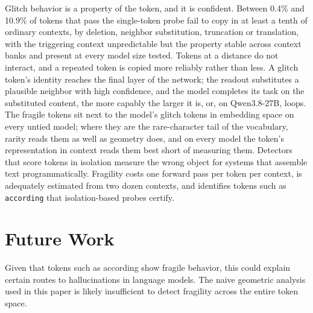 \documentclass[11pt]{article}
\begin{document}
Glitch behavior is a property of the token, and it is confident. Between 0.4\% and 10.9\% of tokens that pass the single-token probe fail to copy in at least a tenth of ordinary contexts, by deletion, neighbor substitution, truncation or translation, with the triggering context unpredictable but the property stable across context banks and present at every model size tested. Tokens at a distance do not interact, and a repeated token is copied more reliably rather than less. A glitch token's identity reaches the final layer of the network; the readout substitutes a plausible neighbor with high confidence, and the model completes its task on the substituted content, the more capably the larger it is, or, on Qwen3.8-27B, loops. The fragile tokens sit next to the model's glitch tokens in embedding space on every untied model; where they are the rare-character tail of the vocabulary, rarity reads them as well as geometry does, and on every model the token's representation in context reads them best short of measuring them. Detectors that score tokens in isolation measure the wrong object for systems that assemble text programmatically. Fragility costs one forward pass per token per context, is adequately estimated from two dozen contexts, and identifies tokens such as \texttt{according} that isolation-based probes certify.

\section{Future Work}\label{future-work}

Given that tokens such as according show fragile behavior, this could explain certain routes to hallucinations in language models. The naive geometric analysis used in this paper is likely insufficient to detect fragility across the entire token space.
\end{document}
